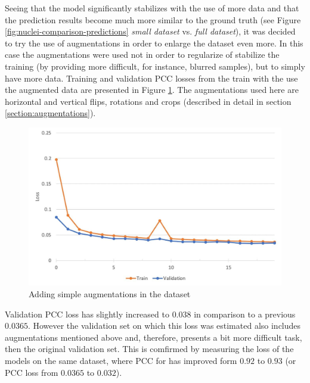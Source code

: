 Seeing that the model significantly stabilizes with the use of more data and that the prediction results become much more similar to the ground truth (see Figure \ref{fig:nuclei-comparison-predictions} \textit{small dataset} vs. \textit{full dataset}), it was decided to try the use of augmentations in order to enlarge the dataset even more. In this case the augmentations were used not in order to regularize of stabilize the training (by providing more difficult, for instance, blurred samples), but to simply have more data. Training and validation PCC losses from the train with the use the augmented data are presented in Figure \ref{fig:no-reg-augmented}. The augmentations used here are horizontal and vertical flips, rotations and crops (described in detail in section \ref{section:augmentations}). 
\begin{figure}[H]
	\begin{center}
		\includegraphics[width=0.5\linewidth]{bilder/nuclei/no-reg-but-aug.jpg}
		\caption{Adding simple augmentations in the dataset}\label{fig:no-reg-augmented}
	\end{center}
\end{figure}
Validation PCC loss has slightly increased to $0.038$ in comparison to a previous $0.0365$. However the validation set on which this loss was estimated also includes augmentations mentioned above and, therefore, presents a bit more difficult task, then the original validation set. This is comfirmed by measuring the loss of the models on the same dataset, where PCC for has improved form $0.92$ to $0.93$ (or PCC loss from $0.0365$ to $0.032$).

